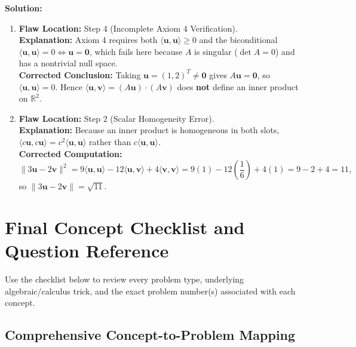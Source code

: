 \documentclass[11pt, letterpaper]{article}
\theoremstyle{definition}
\theoremstyle{remark}
\begin{document}
\textbf{Solution:}
\begin{enumerate}[label=(\alph*)]
    \item \textbf{Flaw Location:} Step 4 (Incomplete Axiom 4 Verification).\\
    \textbf{Explanation:} Axiom 4 requires both $\langle \mathbf{u}, \mathbf{u} \rangle \ge 0$ and the biconditional $\langle \mathbf{u}, \mathbf{u} \rangle = 0 \iff \mathbf{u} = \mathbf{0}$, which fails here because $A$ is singular ($\det A = 0$) and has a nontrivial null space.\\
    \textbf{Corrected Conclusion:} Taking $\mathbf{u} = (1, 2)^T \neq \mathbf{0}$ gives $A\mathbf{u} = \mathbf{0}$, so $\langle \mathbf{u}, \mathbf{u} \rangle = 0$. Hence $\langle \mathbf{u}, \mathbf{v} \rangle = (A\mathbf{u})\cdot(A\mathbf{v})$ does \textbf{not} define an inner product on $\mathbb{R}^2$.
    \item \textbf{Flaw Location:} Step 2 (Scalar Homogeneity Error).\\
    \textbf{Explanation:} Because an inner product is homogeneous in both slots, $\langle c\mathbf{u}, c\mathbf{u} \rangle = c^2\langle \mathbf{u}, \mathbf{u} \rangle$ rather than $c\langle \mathbf{u}, \mathbf{u} \rangle$.\\
    \textbf{Corrected Computation:}
    \[
    \|3\mathbf{u} - 2\mathbf{v}\|^2 = 9\langle \mathbf{u}, \mathbf{u} \rangle - 12\langle \mathbf{u}, \mathbf{v} \rangle + 4\langle \mathbf{v}, \mathbf{v} \rangle = 9(1) - 12\left(\frac{1}{6}\right) + 4(1) = 9 - 2 + 4 = 11,
    \]
    so $\|3\mathbf{u} - 2\mathbf{v}\| = \sqrt{11}$.
\end{enumerate}

\newpage

\section{Final Concept Checklist and Question Reference}

Use the checklist below to review every problem type, underlying algebraic/calculus trick, and the exact problem number(s) associated with each concept.

\subsection{Comprehensive Concept-to-Problem Mapping}
\end{document}
